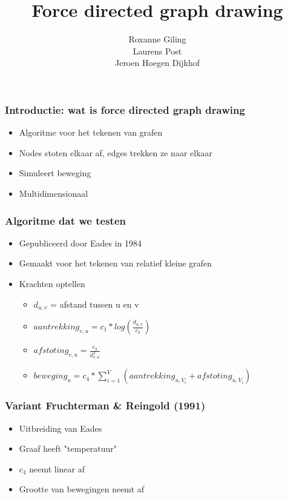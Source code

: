 \documentclass[16pt]{beamer}
\title{\textbf{Force directed graph drawing}}
\author{Roxanne Giling\\
		Laurens Post\\
		Jeroen Hoegen Dijkhof}
\date{}
\begin{document}
\begin{frame}
    \titlepage
\end{frame}

\begin{frame}
    \frametitle{Introductie: wat is force directed graph drawing}
    \begin{itemize}
        \item{Algoritme voor het tekenen van grafen}
        \item{Nodes stoten elkaar af, edges trekken ze naar elkaar}
        \item{Simuleert beweging}
        \item{Multidimensionaal}
    \end{itemize}
\end{frame}

\begin{frame}
    \frametitle{Algoritme dat we testen}
    \begin{itemize}
        \item{Gepubliceerd door Eades in 1984}
        \item{Gemaakt voor het tekenen van relatief kleine grafen}
        \item{Krachten optellen}
        \begin{itemize}
            \item{
                 $d_{u,v}$ = afstand tussen u en v
            }
            \item{
                \begin{math}
                    aantrekking_{v,u} = c_1 * log(\frac{d_{u,v}}{c_2})
                \end{math}
            }
            \item{
                \begin{math}
                    afstoting_{v,u} = \frac{c_3}{d_{v,u}^2}
                \end{math}
            }
            \item {
                \begin{math}
                    beweging_u = c_4 * \sum_{i=1}^V{(aantrekking_{u,V_i} + afstoting_{u,V_i})}
                \end{math}
            }
        \end{itemize}
    \end{itemize}
\end{frame}

\begin{frame}
    \frametitle{Variant Fruchterman \& Reingold (1991)}
    \begin{itemize}
		\item{Uitbreiding van Eades}
		\item{Graaf heeft "temperatuur"}
		\item{$c_4$ neemt linear af}
		\item{Grootte van bewegingen neemt af}
    \end{itemize}
\end{frame}
\end{document}

